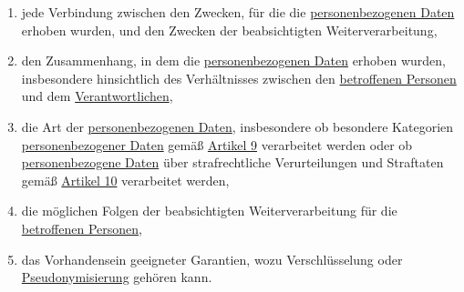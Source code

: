 \begin{enumerate}
\begin{enumerate}
    \item jede Verbindung zwischen den Zwecken, für die die \hyperref[itm:04-1]{personenbezogenen Daten} erhoben wurden,
     und den Zwecken der beabsichtigten Weiterverarbeitung,%
    \label{itm:06-4a}

    \item den Zusammenhang, in dem die \hyperref[itm:04-1]{personenbezogenen Daten} erhoben wurden, insbesondere
     hinsichtlich des Verhältnisses zwischen den \hyperref[itm:04-1]{betroffenen Personen} und dem \hyperref[itm:04-7]
     {Verantwortlichen},%
    \label{itm:06-4b}

    \item die Art der \hyperref[itm:04-1]{personenbezogenen Daten}, insbesondere ob besondere Kategorien \hyperref
     [itm:04-1]{personenbezogener Daten} gemäß
     \hyperref[ch:9]{Artikel 9} verarbeitet werden oder ob \hyperref[itm:04-1]{personenbezogene Daten} über
      strafrechtliche Verurteilungen und Straftaten gemäß \hyperref[ch:10]{Artikel 10} verarbeitet werden,%
    \label{itm:06-4c}

    \item die möglichen Folgen der beabsichtigten Weiterverarbeitung für die \hyperref[itm:04-1]{betroffenen Personen},%
    \label{itm:06-4d}

    \item das Vorhandensein geeigneter Garantien, wozu Verschlüsselung oder \hyperref[itm:04-5]
     {Pseudonymisierung} gehören kann.%
    \label{itm:06-4e}

  \end{enumerate}

\end{enumerate}


